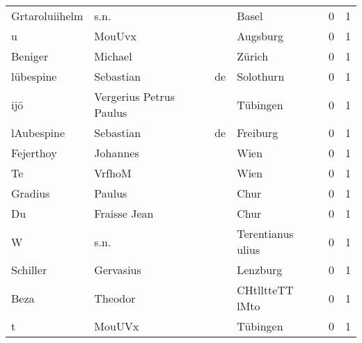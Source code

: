 \begin{tabular}{llllrr}
           Grtaroluiihelm &                               s.n. &             &                                       Basel &          0 &         1 \\
                        u &                             MouUvx &             &                                    Augsburg &          0 &         1 \\
                  Beniger &                            Michael &             &                                      Zürich &          0 &         1 \\
                lübespine &                          Sebastian &          de &                                   Solothurn &          0 &         1 \\
                      ijö &            Vergerius Petrus Paulus &             &                                    Tübingen &          0 &         1 \\
               lAubespine &                          Sebastian &          de &                                    Freiburg &          0 &         1 \\
                Fejerthoy &                           Johannes &             &                                        Wien &          0 &         1 \\
                       Te &                             VrfhoM &             &                                        Wien &          0 &         1 \\
                  Gradius &                             Paulus &             &                                        Chur &          0 &         1 \\
                       Du &                       Fraisse Jean &             &                                        Chur &          0 &         1 \\
                        W &                               s.n. &             &                           Terentianus ulius &          0 &         1 \\
                 Schiller &                          Gervasius &             &                                    Lenzburg &          0 &         1 \\
                     Beza &                            Theodor &             &                             CHtlltteTT lMto &          0 &         1 \\
                        t &                             MouUVx &             &                                    Tübingen &          0 &         1 \\

\end{tabular}
